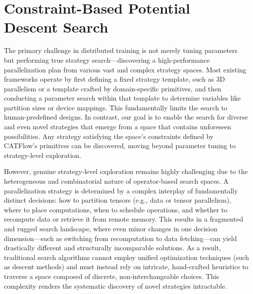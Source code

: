 \documentclass[letterpaper,twocolumn,10pt]{article}
\newcommand{\name}{CATFlow}
\begin{document}
\section{Constraint-Based Potential Descent Search}
\label{sec:search}

The primary challenge in distributed training is not merely tuning parameters but performing true strategy search—discovering a high-performance parallelization plan from various vast and complex strategy spaces. Most existing frameworks operate by first defining a fixed strategy template, such as 3D parallelism or a template crafted by domain-specific primitives, and then conducting a parameter search within that template to determine variables like partition sizes or device mappings. This fundamentally limits the search to human-predefined designs. In contrast, our goal is to enable the search for diverse and even novel strategies that emerge from a space that contains unforeseen possibilities. Any strategy satisfying the space's constraints defined by \name{}'s primitives can be discovered, moving beyond parameter tuning to strategy-level exploration.

However, genuine strategy-level exploration remains highly challenging due to the heterogeneous and combinatorial nature of operator-based search spaces. A parallelization strategy is determined by a complex interplay of fundamentally distinct decisions: how to partition tensors (e.g., data or tensor parallelism), where to place computations, when to schedule operations, and whether to recompute data or retrieve it from remote memory. This results in a fragmented and rugged search landscape, where even minor changes in one decision dimension—such as switching from recomputation to data fetching—can yield drastically different and structurally incomparable solutions. As a result, traditional search algorithms cannot employ unified optimization techniques (such as descent methods) and must instead rely on intricate, hand-crafted heuristics to traverse a space composed of discrete, non-interchangeable choices. This complexity renders the systematic discovery of novel strategies intractable.
\end{document}
